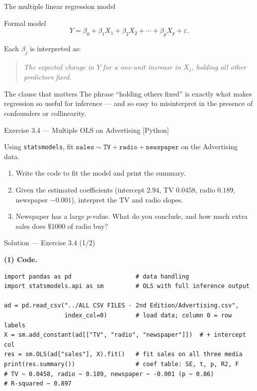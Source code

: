 \documentclass[aspectratio=169,11pt]{beamer}
\begin{document}
\begin{frame}{The multiple linear regression model}
  \begin{block}{Formal model}
    \[
      \boxed{\;
        Y = \beta_0 + \beta_1 X_1 + \beta_2 X_2 + \cdots + \beta_p X_p
            + \varepsilon.
      \;}
    \]
  \end{block}
  Each $\beta_j$ is interpreted as:
  \begin{quote}
    \emph{The expected change in $Y$ for a one-unit increase in $X_j$,
    holding all other predictors fixed.}
  \end{quote}
  \begin{alertblock}{The clause that matters}
    The phrase ``holding others fixed'' is exactly what makes regression
    so useful for inference --- and so easy to misinterpret in the
    presence of confounders or collinearity.
  \end{alertblock}
\end{frame}


\begin{frame}[fragile]{Exercise 3.4 --- Multiple OLS on Advertising [Python]}
  \begin{exercise}
    Using \texttt{statsmodels}, fit
    $\texttt{sales} \sim \texttt{TV}+\texttt{radio}+\texttt{newspaper}$
    on the Advertising data.
    \begin{enumerate}
      \item Write the code to fit the model and print the summary.
      \item Given the estimated coefficients
            (intercept $2.94$, TV $0.0458$, radio $0.189$,
            newspaper $-0.001$), interpret the TV and radio slopes.
      \item Newspaper has a large $p$-value. What do you conclude, and
            how much extra sales does \$1000 of radio buy?
    \end{enumerate}
  \end{exercise}
\end{frame}

\begin{frame}[fragile]{Solution --- Exercise 3.4 (1/2)}
  \begin{solutionbox}
    \textbf{(1) Code.}
\begin{lstlisting}
import pandas as pd                  # data handling
import statsmodels.api as sm         # OLS with full inference output

ad = pd.read_csv("../ALL CSV FILES - 2nd Edition/Advertising.csv",
                 index_col=0)        # load data; column 0 = row labels
X = sm.add_constant(ad[["TV", "radio", "newspaper"]])  # + intercept col
res = sm.OLS(ad["sales"], X).fit()   # fit sales on all three media
print(res.summary())                 # coef table: SE, t, p, R2, F
# TV ~ 0.0458, radio ~ 0.189, newspaper ~ -0.001 (p ~ 0.86)
# R-squared ~ 0.897
\end{lstlisting}
  \end{solutionbox}
\end{frame}
\end{document}
